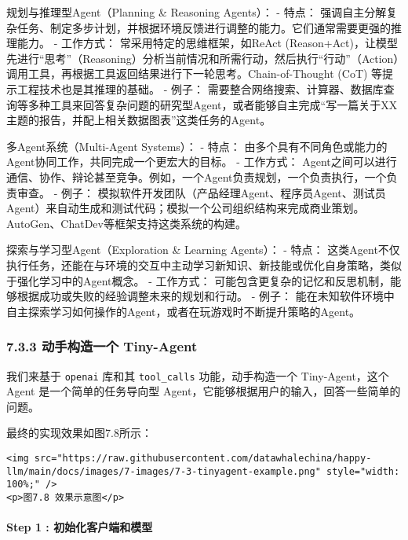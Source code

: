\documentclass[
]{article}
\begin{document}
规划与推理型Agent（Planning \& Reasoning Agents）： - 特点：
强调自主分解复杂任务、制定多步计划，并根据环境反馈进行调整的能力。它们通常需要更强的推理能力。
- 工作方式： 常采用特定的思维框架，如ReAct
(Reason+Act)，让模型先进行``思考''（Reasoning）分析当前情况和所需行动，然后执行``行动''（Action）调用工具，再根据工具返回结果进行下一轮思考。Chain-of-Thought
(CoT) 等提示工程技术也是其推理的基础。 - 例子：
需要整合网络搜索、计算器、数据库查询等多种工具来回答复杂问题的研究型Agent，或者能够自主完成``写一篇关于XX主题的报告，并配上相关数据图表''这类任务的Agent。

多Agent系统（Multi-Agent Systems）： - 特点：
由多个具有不同角色或能力的Agent协同工作，共同完成一个更宏大的目标。 -
工作方式：
Agent之间可以进行通信、协作、辩论甚至竞争。例如，一个Agent负责规划，一个负责执行，一个负责审查。
- 例子：
模拟软件开发团队（产品经理Agent、程序员Agent、测试员Agent）来自动生成和测试代码；模拟一个公司组织结构来完成商业策划。AutoGen、ChatDev等框架支持这类系统的构建。

探索与学习型Agent（Exploration \& Learning Agents）： - 特点：
这类Agent不仅执行任务，还能在与环境的交互中主动学习新知识、新技能或优化自身策略，类似于强化学习中的Agent概念。
- 工作方式：
可能包含更复杂的记忆和反思机制，能够根据成功或失败的经验调整未来的规划和行动。
- 例子：
能在未知软件环境中自主探索学习如何操作的Agent，或者在玩游戏时不断提升策略的Agent。

\subsubsection{7.3.3 动手构造一个
Tiny-Agent}\label{ux52a8ux624bux6784ux9020ux4e00ux4e2a-tiny-agent}

我们来基于 \texttt{openai} 库和其 \texttt{tool\_calls}
功能，动手构造一个 Tiny-Agent，这个 Agent 是一个简单的任务导向型
Agent，它能够根据用户的输入，回答一些简单的问题。

最终的实现效果如图7.8所示：

\begin{verbatim}
<img src="https://raw.githubusercontent.com/datawhalechina/happy-llm/main/docs/images/7-images/7-3-tinyagent-example.png" style="width: 100%;" />
<p>图7.8 效果示意图</p>
\end{verbatim}

\paragraph{Step 1 :
初始化客户端和模型}\label{step-1-ux521dux59cbux5316ux5ba2ux6237ux7aefux548cux6a21ux578b}
\end{document}
